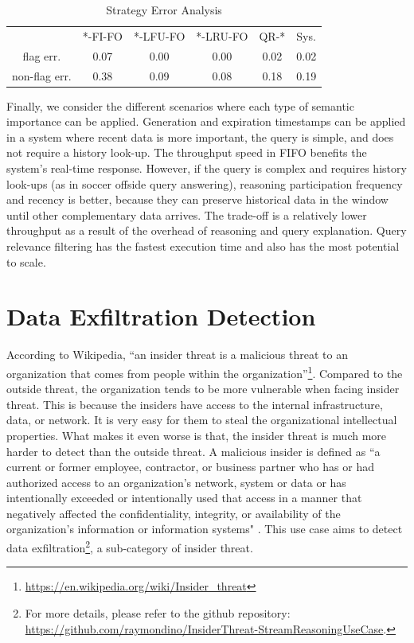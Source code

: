 \begin{table}[!htbp]
\centering
\caption{Strategy Error Analysis}
\label{tab:error}
\begin{tabular}{|c||c|c|c|c|l|}
\hline
 & *-FI-FO & *-LFU-FO & *-LRU-FO & QR-* & Sys. \\ \hhline{|=#=|=|=|=|=|}
flag err. & 0.07 & 0.00 & 0.00 & 0.02 & 0.02 \\ \hline
non-flag err. & 0.38 & 0.09 & 0.08 & 0.18 & 0.19 \\ \hline
\end{tabular}
\end{table}

Finally, we consider the different scenarios where each type of semantic importance can be applied. 
Generation and expiration timestamps can be applied in a system where recent data is more important, the query is simple, and does not require a history look-up. 
The throughput speed in FIFO benefits the system's real-time response. 
However, if the query is complex and requires history look-ups (as in soccer offside query answering), reasoning participation frequency and recency is better, because they can preserve historical data in the window until other complementary data arrives. 
The trade-off is a relatively lower throughput as a result of the overhead of reasoning and query explanation.
Query relevance filtering has the fastest execution time and also has the most potential to scale.
%
\section{Data Exfiltration Detection}
According to Wikipedia, ``an insider threat is a malicious threat to an organization that comes from people within the organization''\footnote{\url{https://en.wikipedia.org/wiki/Insider\_threat}}. 
Compared to the outside threat, the organization tends to be more vulnerable when facing insider threat. 
This is because the insiders have access to the internal infrastructure, data, or network.
It is very easy for them to steal the organizational intellectual properties.
What makes it even worse is that, the insider threat is much more harder to detect than the outside threat. 
A malicious insider is defined as ``a current or former employee, contractor, or business partner who has or had authorized access to an organization's network, system or data or has intentionally exceeded or intentionally used that access in a manner that negatively affected the confidentiality, integrity, or availability of the organization's information or information systems" \cite{CERT-onto} \cite{silowash2012common}.
This use case aims to detect data exfiltration\footnote{For more details, please refer to the github repository: \url{https://github.com/raymondino/InsiderThreat-StreamReasoningUseCase}.}, a sub-category of insider threat.
%
